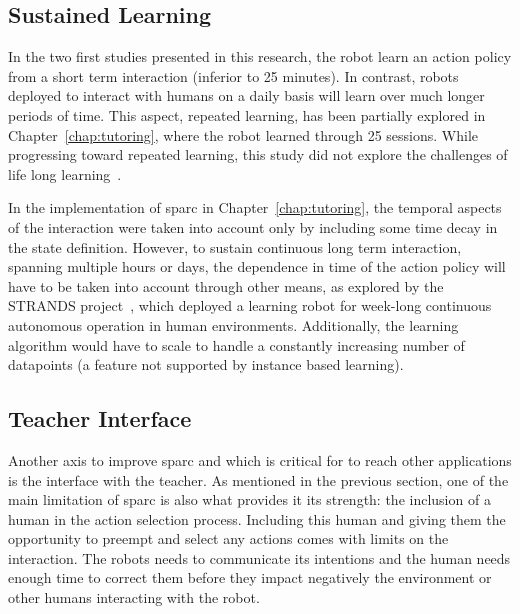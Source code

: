 \subsection{Sustained Learning}


In the two first studies presented in this research, the robot learn an action policy from a short term interaction (inferior to 25 minutes). In contrast, robots deployed to interact with humans on a daily basis will learn over much longer periods of time. This aspect, repeated learning, has been partially explored in Chapter~\ref{chap:tutoring}, where the robot learned through 25 sessions. While progressing toward repeated learning, this study did not explore the challenges of life long learning~\citep{thrun1995lifelong}. 

In the implementation of \gls{sparc} in Chapter~\ref{chap:tutoring}, the temporal aspects of the interaction were taken into account only by including some time decay in the state definition. However, to sustain continuous long term interaction, spanning multiple hours or days, the dependence in time of the action policy will have to be taken into account through other means, as explored by the STRANDS project~\citep{hawes2017strands}, which deployed a learning robot for week-long continuous autonomous operation in human environments. Additionally, the learning algorithm would have to scale to handle a constantly increasing number of datapoints (a feature not supported by instance based learning).


\subsection{Teacher Interface}

Another axis to improve \gls{sparc} and which is critical for to reach other applications is the interface with the teacher. As mentioned in the previous section, one of the main limitation of \gls{sparc} is also what provides it its strength: the inclusion of a human in the action selection process. Including this human and giving them the opportunity to preempt and select any actions comes with limits on the interaction. The robots needs to communicate its intentions and the human needs enough time to correct them before they impact negatively the environment or other humans interacting with the robot. %

